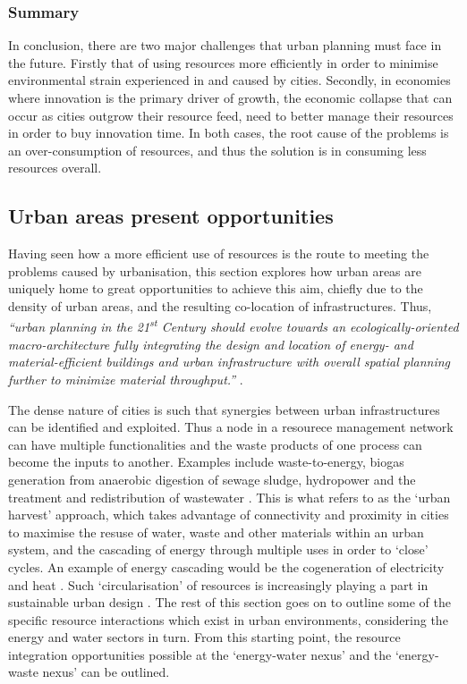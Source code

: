 \subsubsection*{Summary}
In conclusion, there are two major challenges that urban planning must face in the future. Firstly that of using resources more efficiently in order to minimise environmental strain experienced in and caused by cities. Secondly, in economies where innovation is the primary driver of growth, the economic collapse that can occur as cities outgrow their resource feed, need to better manage their resources in order to buy innovation time. In both cases, the root cause of the problems is an over-consumption of resources, and thus the solution is in consuming less resources overall.

\subsection{Urban areas present opportunities}
\label{sec:urbanOpps}
Having seen how a more efficient use of resources is the route to meeting the problems caused by urbanisation, this section explores how urban areas are uniquely home to great opportunities to achieve this aim, chiefly due to the density of urban areas, and the resulting co-location of infrastructures. Thus, \emph{``urban planning in the 21\textsuperscript{st} Century should evolve towards an ecologically-oriented macro-architecture fully integrating the design and location of energy- and material-efficient buildings and urban infrastructure with overall spatial planning further to minimize material throughput.''} \citep{Rees1999}. 

The dense nature of cities is such that synergies between urban infrastructures can be identified and exploited. Thus a node in a resourece management network can have multiple functionalities and the waste products of one process can become the inputs to another. Examples include waste-to-energy, biogas generation from anaerobic digestion of sewage sludge, hydropower and the treatment and redistribution of wastewater \citep{Kharrazi2012}. This is what \citet{Leduc2010} refers to as the `urban harvest' approach, which takes advantage of connectivity and proximity in cities to maximise the resuse of water, waste and other materials within an urban system, and the cascading of energy through multiple uses in order to `close' cycles. An example of energy cascading would be the cogeneration of electricity and heat \citep{Grubler2009}. Such `circularisation' of resources is increasingly playing a part in sustainable urban design \citep{Meijer2011}. The rest of this section goes on to outline some of the specific resource interactions which exist in urban environments, considering the energy and water sectors in turn. From this starting point, the resource integration opportunities possible at the `energy-water nexus' and the `energy-waste nexus' can be outlined.

